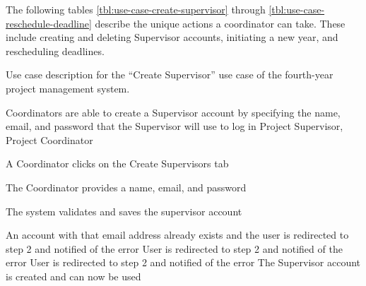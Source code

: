 \documentclass[document.tex]{subfiles}
\begin{document}
The following tables \ref{tbl:use-case-create-supervisor} through \ref{tbl:use-case-reschedule-deadline} describe the unique actions a coordinator can take. These include creating and deleting Supervisor accounts, initiating a new year, and rescheduling deadlines.


\begin{table}
  \centering
  \caption{Use case description for the ``Create Supervisor'' use case of the fourth-year project management system.}
  \label{tbl:use-case-create-supervisor}

  \begin{usecase}
    Coordinators are able to create a Supervisor account by specifying the name, email, and password that the Supervisor will use to log in
    Project Supervisor, Project Coordinator
    \ucnormal
    \begin{ucenum}
      \item A Coordinator clicks on the Create Supervisors tab
      \item The Coordinator provides a name, email, and password
      \item The system validates and saves the supervisor account
    \end{ucenum}
    An account with that email address already exists and the user is redirected to step 2 and notified of the error
    User is redirected to step 2 and notified of the error
    User is redirected to step 2 and notified of the error
    The Supervisor account is created and can now be used
  \end{usecase}
\end{table}
\end{document}
